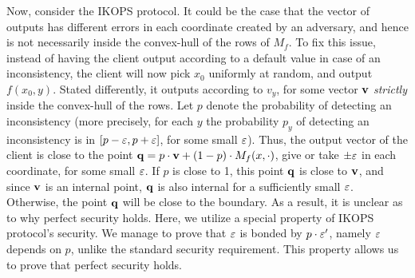 \documentclass{llncs}
\renewcommand{\q}{\myvec{q}}
\renewcommand{\v}{\myvec{v}}
\begin{document}
Now, consider the IKOPS protocol. It could be the case that the vector of outputs has different errors in each coordinate created by an adversary, and hence is not necessarily inside the convex-hull of the rows of $M_f$. To fix this issue, instead of having the client output according to a default value in case of an inconsistency, the client will now pick $x_0$ uniformly at random, and output $f(x_0,y)$. Stated differently, it outputs according to $v_y$, for some vector $\v$ \emph{strictly} inside the convex-hull of the rows. 
Let $p$ denote the probability of detecting an inconsistency
(more precisely, for each $y$ the probability $p_y$ of detecting an inconsistency is in $[p-\varepsilon,p+\varepsilon]$, for some small $\varepsilon$).
Thus, the output vector of the client is close to the point $\q=p\cdot \v + (1-p)\cdot M_f(x,\cdot)$, give or take $\pm \varepsilon$ in each coordinate, for some small $\varepsilon$.
If $p$ is close to 1, this point $\q$ is close to $\v$, and since $\v$ is an internal point, $\q$ is also internal for a sufficiently small $\varepsilon$. Otherwise, the point $\q$ will be close to the boundary. As a result, it is unclear as to why perfect security holds. Here, we utilize a special property of IKOPS protocol's security. We manage to prove that $\varepsilon$ is bonded by $p\cdot \varepsilon'$, namely $\varepsilon$ depends on $p$, unlike the standard security requirement. This property allows us to prove that perfect security holds.
\end{document}
